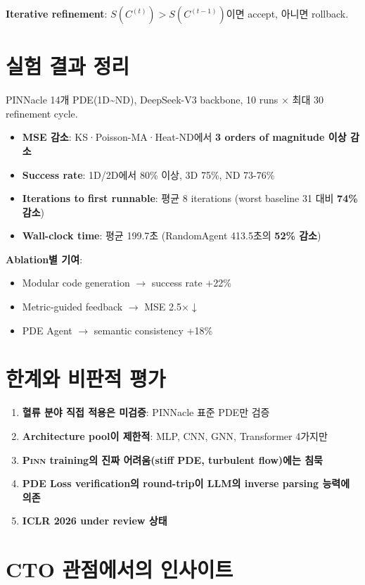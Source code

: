 \documentclass[11pt,a4paper,oneside]{report}
\newcommand{\pinn}{\textsc{Pinn}}
\begin{document}
\textbf{Iterative refinement}: $S(C^{(t)}) > S(C^{(t-1)})$이면 accept, 아니면 rollback.

\section{실험 결과 정리}

PINNacle 14개 PDE(1D\textasciitilde{}ND), DeepSeek-V3 backbone, 10 runs $\times$ 최대 30 refinement cycle.
\begin{itemize}
\item \textbf{MSE 감소}: KS·Poisson-MA·Heat-ND에서 \textbf{3 orders of magnitude 이상 감소}
\item \textbf{Success rate}: 1D/2D에서 80\% 이상, 3D 75\%, ND 73-76\%
\item \textbf{Iterations to first runnable}: 평균 8 iterations (worst baseline 31 대비 \textbf{74\% 감소})
\item \textbf{Wall-clock time}: 평균 199.7초 (RandomAgent 413.5초의 \textbf{52\% 감소})
\end{itemize}

\textbf{Ablation별 기여}:
\begin{itemize}
\item Modular code generation $\rightarrow$ success rate +22\%
\item Metric-guided feedback $\rightarrow$ MSE 2.5$\times \downarrow$
\item PDE Agent $\rightarrow$ semantic consistency +18\%
\end{itemize}

\section{한계와 비판적 평가}

\begin{enumerate}
\item \textbf{혈류 분야 직접 적용은 미검증}: PINNacle 표준 PDE만 검증
\item \textbf{Architecture pool이 제한적}: MLP, CNN, GNN, Transformer 4가지만
\item \textbf{\pinn{} training의 진짜 어려움(stiff PDE, turbulent flow)에는 침묵}
\item \textbf{PDE Loss verification의 round-trip이 LLM의 inverse parsing 능력에 의존}
\item \textbf{ICLR 2026 under review 상태}
\end{enumerate}

\section{CTO 관점에서의 인사이트}
\end{document}
